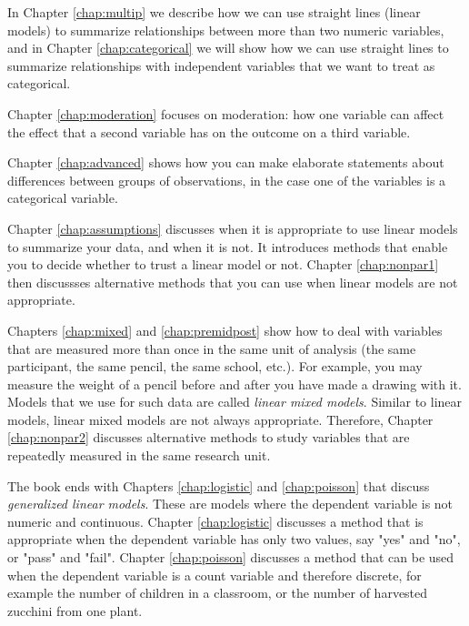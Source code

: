 \documentclass[]{book}\usepackage[]{graphicx}\usepackage[]{color}
\begin{document}
In Chapter \ref{chap:multip} we describe how we can use straight lines (linear models) to summarize relationships between more than two numeric variables, and in Chapter \ref{chap:categorical} we will show how we can use straight lines to summarize relationships with independent variables that we want to treat as categorical.

Chapter \ref{chap:moderation} focuses on moderation: how one variable can affect the effect that a second variable has on the outcome on a third variable.

Chapter \ref{chap:advanced} shows how you can make elaborate statements about differences between groups of observations, in the case one of the variables is a categorical variable.

Chapter \ref{chap:assumptions} discusses when it is appropriate to use linear models to summarize your data, and when it is not. It introduces methods that enable you to decide whether to trust a linear model or not. Chapter \ref{chap:nonpar1} then discussses alternative methods that you can use when linear models are not appropriate.

Chapters \ref{chap:mixed} and \ref{chap:premidpost} show how to deal with variables that are measured more than once in the same unit of analysis (the same participant, the same pencil, the same school, etc.). For example, you may measure the weight of a pencil before and after you have made a drawing with it. Models that we use for such data are called \textit{linear mixed models}. Similar to linear models, linear mixed models are not always appropriate. Therefore, Chapter \ref{chap:nonpar2} discusses alternative methods to study variables that are repeatedly measured in the same research unit.

The book ends with Chapters \ref{chap:logistic} and \ref{chap:poisson} that discuss \textit{generalized linear models}. These are models where the dependent variable is not numeric and continuous. Chapter \ref{chap:logistic} discusses a method that is appropriate when the dependent variable has only two values, say "yes" and "no", or "pass" and "fail". Chapter \ref{chap:poisson} discusses a method that can be used when the dependent variable is a count variable and therefore discrete, for example the number of children in a classroom, or the number of harvested zucchini from one plant.
\end{document}
